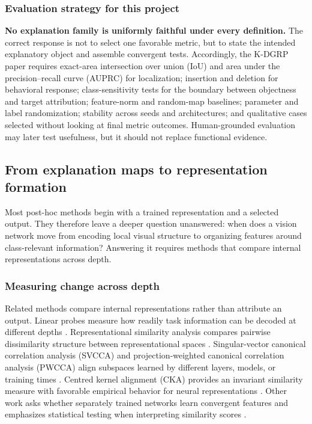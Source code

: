 \subsubsection{Evaluation strategy for this project}

\textbf{No explanation family is uniformly faithful under every definition.}
The correct response is not to select one favorable metric, but to state the
intended explanatory object and assemble convergent tests. Accordingly, the
K-DGRP paper requires exact-area intersection over union (IoU) and area under the
precision--recall curve (AUPRC) for localization; insertion and
deletion for behavioral response; class-sensitivity tests for the boundary
between objectness and target attribution; feature-norm and random-map
baselines; parameter and label randomization; stability across seeds and
architectures; and qualitative cases selected without looking at final metric
outcomes. Human-grounded evaluation may later test usefulness, but it should
not replace functional evidence.

\subsection{From explanation maps to representation formation}

Most post-hoc methods begin with a trained representation and a selected
output. They therefore leave a deeper question unanswered: when does a vision
network move from encoding local visual structure to organizing features around
class-relevant information? Answering it requires methods that compare internal
representations across depth.

\subsubsection{Measuring change across depth}

Related methods compare internal representations rather than attribute an
output. Linear probes measure how
readily task information can be decoded at different depths
\cite{alain2017linearprobes}. Representational similarity analysis compares
pairwise dissimilarity structure between representational spaces
\cite{kriegeskorte2008rsa}. Singular-vector canonical correlation analysis
(SVCCA) and projection-weighted canonical correlation analysis (PWCCA) align
subspaces learned by different layers, models, or training times
\cite{raghu2017svcca,morcos2018pwcca}. Centred kernel alignment (CKA) provides
an invariant similarity measure with favorable empirical behavior for neural
representations \cite{kornblith2019cka}. Other work asks whether separately
trained networks learn convergent features and emphasizes statistical testing
when interpreting similarity scores
\cite{li2015convergent,ding2021grounding}.

